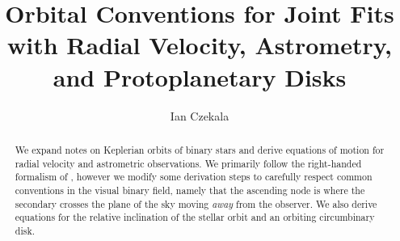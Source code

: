 \documentclass[modern]{aastex61}
\begin{document}
\title{Orbital Conventions for Joint Fits with Radial Velocity, Astrometry, and Protoplanetary Disks}


\author[0000-0002-1483-8811]{Ian Czekala}

\begin{abstract}
We expand notes on Keplerian orbits of binary stars and derive equations of motion for radial velocity and astrometric observations. We primarily follow the right-handed formalism of \citet{murray10}, however we modify some derivation steps to carefully respect common conventions in the visual binary field, namely that the ascending node is where the secondary crosses the plane of the sky moving \emph{away} from the observer. We also derive equations for the relative inclination of the stellar orbit and an orbiting circumbinary disk.
\end{abstract}

\end{document}
